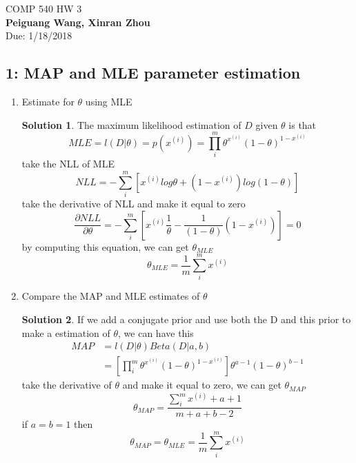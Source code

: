 \documentclass[]{book}
\theoremstyle{definition}
\newtheorem*{soln}{Solution}
\begin{document}
\begin{center}
{\Large COMP 540 \hspace{0.5cm} HW 3}\\
\textbf{Peiguang Wang, Xinran Zhou}\\ %
Due: 1/18/2018 %
\end{center}

\vspace{0.2 cm}


\subsection*{1: MAP and MLE parameter estimation }

\begin{enumerate}
	\item Estimate for $\theta$ using MLE
	\begin{soln}
		The maximum likelihood estimation of $D$ given $\theta$ is that
		$$MLE = l(D|\theta) = p(x^{(i)}) = \prod_{i}^{m} \theta^{x^{(i)}} (1-\theta)^{1-x^{(i)}}$$
		take the NLL of MLE
		$$NLL = -\sum_{i}^{m}[x^{(i)} log \theta +(1-x^{(i)})log (1 - \theta)]$$
		take the derivative of NLL and make it equal to zero
		$$\frac{\partial NLL }{\partial \theta } = -\sum_{i}^{m}[ x^{(i)} \frac{1}{\theta} - \frac{1}{(1-\theta)}(1- x^{(i)})] = 0$$
		by computing this equation, we can get $\theta_{MLE}$
		$$\theta_{MLE} = \frac{1}{m} \sum_{i}^{m} x^{(i)}$$
		
	\end{soln}
	\item Compare the MAP and MLE estimates of $\theta$
	\begin{soln}
		If we add a conjugate prior and use both the D and this prior to make a estimation of $\theta$, we can have this
		\begin{equation*}
			\begin{split}
			MAP &=l(D|\theta)Beta(D|a,b)\\
				&=[\prod_{i}^{m} \theta^{x^{(i)}}(1-\theta)^{1-x^{(i)}}]\theta^{a-1}(1-\theta)^{b -1}
			\end{split}
		\end{equation*}
		take the derivative of $\theta$ and make it equal to zero, we can get $\theta_{MAP}$
		$$\theta_{MAP} = \frac{\sum_{i}^{m}x^{(i) }+ a + 1}{ m + a + b - 2}$$
		if $a = b= 1$ then 
		$$\theta_{MAP} = \theta_{MLE}=\frac{1}{m}\sum_{i}^{m} x^{(i)}$$
	\end{soln}

\end{enumerate}
\end{document}
